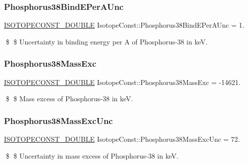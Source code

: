 \subsubsection{\texorpdfstring{Phosphorus38\+Bind\+E\+Per\+A\+Unc}{Phosphorus38BindEPerAUnc}}
{\footnotesize\ttfamily \mbox{\hyperlink{group___isotope_const-_macros_ga8f45a7272ce02c0b4c65c44636ed719a}{I\+S\+O\+T\+O\+P\+E\+C\+O\+N\+S\+T\+\_\+\+D\+O\+U\+B\+LE}} Isotope\+Const\+::\+Phosphorus38\+Bind\+E\+Per\+A\+Unc = 1.}

\$ \$ Uncertainty in binding energy per A of Phosphorus-\/38 in keV. \mbox{\label{group___isotope_const-_phosphorus-_p38_gae56a53a4d0f5627648ece732e610130c}} 
\subsubsection{\texorpdfstring{Phosphorus38\+Mass\+Exc}{Phosphorus38MassExc}}
{\footnotesize\ttfamily \mbox{\hyperlink{group___isotope_const-_macros_ga8f45a7272ce02c0b4c65c44636ed719a}{I\+S\+O\+T\+O\+P\+E\+C\+O\+N\+S\+T\+\_\+\+D\+O\+U\+B\+LE}} Isotope\+Const\+::\+Phosphorus38\+Mass\+Exc = -\/14621.}

\$ \$ Mass excess of Phosphorus-\/38 in keV. \mbox{\label{group___isotope_const-_phosphorus-_p38_ga64f16f5306698577b05ca2be29afcd1e}} 
\subsubsection{\texorpdfstring{Phosphorus38\+Mass\+Exc\+Unc}{Phosphorus38MassExcUnc}}
{\footnotesize\ttfamily \mbox{\hyperlink{group___isotope_const-_macros_ga8f45a7272ce02c0b4c65c44636ed719a}{I\+S\+O\+T\+O\+P\+E\+C\+O\+N\+S\+T\+\_\+\+D\+O\+U\+B\+LE}} Isotope\+Const\+::\+Phosphorus38\+Mass\+Exc\+Unc = 72.}

\$ \$ Uncertainty in mass excess of Phosphorus-\/38 in keV. \mbox{\label{group___isotope_const-_phosphorus-_p38_ga070a394ad9f05c0c0763f402c8a29c28}} 
